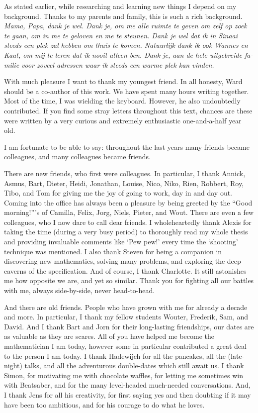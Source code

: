 As stated earlier, while researching and learning new things I depend on my background. Thanks to my parents and family, this is such a rich background. \emph{\foreignlanguage{dutch}{Mama, Papa, dank je wel. Dank je, om me alle ruimte te geven om zelf op zoek te gaan, om in me te geloven en me te steunen. Dank je wel dat ik in Sinaai steeds een plek zal hebben om thuis te komen. Natuurlijk dank ik ook Wannes en Kaat, om mij te leren dat ik nooit alleen ben. Dank je, aan de hele uitgebreide familie voor zoveel adressen waar ik steeds een warme plek kan vinden.}}

With much pleasure I want to thank my youngest friend. In all honesty, Ward should be a co-author of this work. We have spent many hours writing together. Most of the time, I was wielding the keyboard. However, he also undoubtedly contributed. If you find some stray letters throughout this text, chances are these were written by a very curious and extremely enthusiastic one-and-a-half year old.

I am fortunate to be able to say: throughout the last years many friends became colleagues, and many colleagues became friends.

There are new friends, who first were colleagues. In particular, I thank Annick, Asmus, Bart, Dieter, Heidi, Jonathan, Louise, Nico, Niko, Rien, Robbert, Roy, Tibo, and Tom for giving me the joy of going to work, day in and day out. Coming into the office has always been a pleasure by being greeted by the ``Good morning!'''s of Camilla, Felix, Jorg, Niels, Pieter, and Wout. There are even a few colleagues, who I now dare to call dear friends. I wholeheartedly thank Alexis for taking the time (during a very busy period) to thoroughly read my whole thesis and providing invaluable comments like `Pew pew!' every time the `shooting' technique was mentioned. I also thank Steven for being a companion in discovering new mathematics, solving many problems, and exploring the deep caverns of the \cpp{} specification. And of course, I thank Charlotte. It still astonishes me how opposite we are, and yet so similar. Thank you for fighting all our battles with me, always side-by-side, never head-to-head. 

And there are old friends. People who have grown with me for already a decade and more. In particular, I thank my fellow students Wouter, Frederik, Sam, and David. And I thank Bart and Jorn for their long-lasting friendships, our dates are as valuable as they are scares. All of you have helped me become the mathematician I am today, however some in particular contributed a great deal to the person I am today. I thank Hadewijch for all the pancakes, all the (late-night) talks, and all the adventurous double-dates which still await us. I thank Simon, for motivating me with chocolate waffles, for letting me sometimes win with Beatsaber, and for the many level-headed much-needed conversations. And, I thank Jens for all his creativity, for first saying yes and then doubting if it may have been too ambitious, and for his courage to do what he loves. 

